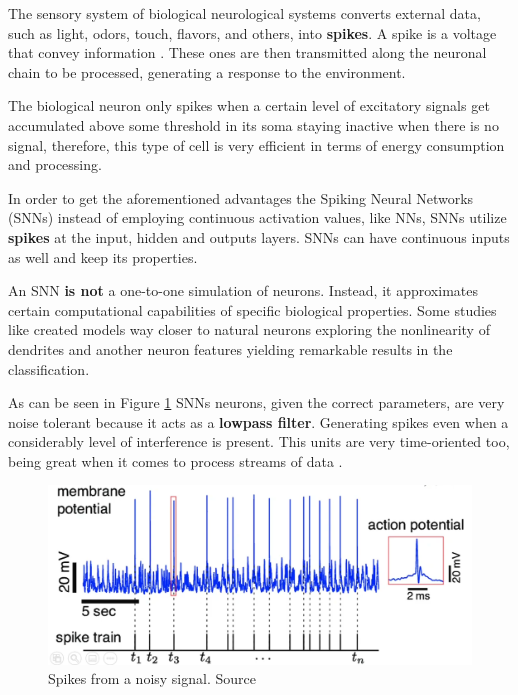 		\par The sensory system of biological neurological systems converts external data, such as light, odors, touch, flavors, and others, into \textbf{spikes}. A spike is a voltage that convey information \cite{kasabov2019time}. These ones are then transmitted along the neuronal chain to be processed, generating a response to the environment.
		
		\par The biological neuron only spikes when a certain level of excitatory signals get accumulated above some threshold in its soma staying inactive when there is no signal, therefore, this type of cell is very efficient in terms of energy consumption and processing.
		
		\par In order to get the aforementioned advantages the Spiking Neural Networks (SNNs) instead of employing continuous activation values, like NNs, SNNs utilize \textbf{spikes} at the input, hidden and outputs layers. SNNs can have continuous inputs as well and keep its properties.
		
		
		\par An SNN \textbf{is not} a one-to-one simulation of neurons. Instead, it approximates certain computational capabilities of specific biological properties. Some studies like \cite{jones2020single} created models way closer to natural neurons exploring the nonlinearity of dendrites and another neuron features yielding remarkable results in the classification.
		
		\begin{multicols}{2}
			\par As can be seen in Figure \ref{fig:neuronspike} SNNs neurons, given the correct parameters, are very noise tolerant because it acts as a \textbf{lowpass filter}. Generating spikes even when a considerably level of interference is present. This units are very time-oriented too, being great when it comes to process streams of data \cite{10242251}.
		\columnbreak
			\begin{figure}[H]
				\centering
				\includegraphics[width=.88\linewidth]{images/neuronSpikes}
				\caption{Spikes from a noisy signal. Source \cite{dan_goodman_2022_7044500}}
				\label{fig:neuronspike}
			\end{figure} 
		\end{multicols}

